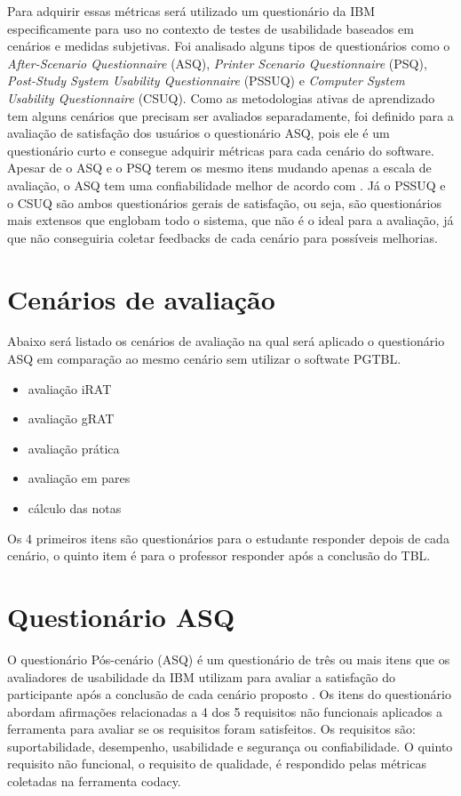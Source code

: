Para adquirir essas métricas será utilizado um questionário da IBM especificamente para uso no contexto de testes de
usabilidade baseados em cenários e medidas subjetivas. Foi analisado alguns tipos de questionários como o
\textit{After-Scenario Questionnaire} (ASQ), \textit{Printer Scenario Questionnaire} (PSQ), \textit{Post-Study System
Usability Questionnaire} (PSSUQ) e \textit{Computer System Usability Questionnaire} (CSUQ). Como as metodologias ativas
de aprendizado tem alguns cenários que precisam ser avaliados separadamente, foi definido para a avaliação de satisfação
dos usuários o questionário ASQ, pois ele é um questionário curto e consegue adquirir métricas para cada cenário do
software. Apesar de o ASQ e o PSQ terem os mesmo itens mudando apenas a escala de avaliação, o ASQ tem uma
confiabilidade melhor de acordo com \cite{questionario}. Já o PSSUQ e o CSUQ são ambos questionários gerais de
satisfação, ou seja, são questionários mais extensos que englobam todo o sistema, que não é o ideal para a avaliação, já
que não conseguiria coletar feedbacks de cada cenário para possíveis melhorias.

\section{Cenários de avaliação}

Abaixo será listado os cenários de avaliação na qual será aplicado o questionário ASQ em comparação ao mesmo cenário sem
utilizar o softwate PGTBL.

\begin{itemize}
  \item avaliação iRAT
  \item avaliação gRAT
  \item avaliação prática
  \item avaliação em pares
  \item cálculo das notas
\end{itemize}

Os 4 primeiros itens são questionários para o estudante responder depois de cada cenário, o quinto item é
para o professor responder após a conclusão do TBL.

\section{Questionário ASQ}

O questionário Pós-cenário (ASQ) é um questionário de três ou mais itens que os avaliadores de usabilidade da IBM utilizam para
avaliar a satisfação do participante após a conclusão de cada cenário proposto \cite{questionario}. Os itens do
questionário abordam afirmações relacionadas a 4 dos 5 requisitos não funcionais aplicados a ferramenta para avaliar se
os requisitos foram satisfeitos. Os requisitos são: suportabilidade, desempenho, usabilidade e segurança ou
confiabilidade. O quinto requisito não funcional, o requisito de qualidade, é respondido pelas métricas
coletadas na ferramenta codacy.

